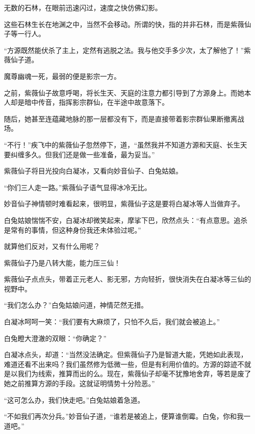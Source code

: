 
\begin{this_body}

无数的石林，在眼前迅速闪过，速度之快仿佛幻影。

这些石林生长在地渊之中，当然不会移动。所谓的快，指的并非石林，而是紫薇仙子等一行人。

“方源既然能伏杀了主上，定然有逃脱之法。我与他交手多少次，太了解他了！”紫薇仙子道。

魔尊幽魂一死，最弱的便是影宗一方。

之前，紫薇仙子故意呼喝，将长生天、天庭的注意力都引导到了方源身上。而她本人却是暗中传音，指挥影宗群仙，在半途中故意落下。

随后，她甚至连蕴藏地脉的那一层都没有下，而是直接带着影宗群仙果断撤离战场。

“不行！”疾飞中的紫薇仙子忽然停下，道，“虽然我并不知道方源和天庭、长生天要纠缠多久。但我们还是做一些准备，最为妥当。”

紫薇仙子将目光投向白凝冰，又看向妙音仙子、白兔姑娘。

“你们三人走一路。”紫薇仙子语气显得冰冷无比。

妙音仙子神情顿时难看起来，很明显，紫薇仙子这是要将白凝冰等人当做弃子。

白兔姑娘惴惴不安，白凝冰却微笑起来，摩挲下巴，欣然点头：“有点意思。追杀是常有的事情，但这种身份我还未体验过呢。”

就算他们反对，又有什么用呢？

紫薇仙子乃是八转大能，能力压三仙！

紫薇仙子点点头，带着正元老人、影无邪，方向轻折，很快消失在白凝冰等三仙的视野中。

“我们怎么办？”白兔姑娘问道，神情茫然无措。

白凝冰呵呵一笑：“我们要有大麻烦了，只怕不久后，我们就会被追上。”

白兔瞪大澄澈的双眼：“你确定？”

白凝冰点头，却道：“当然没法确定。但紫薇仙子乃是智道大能，凭她如此表现，难道还看不出来吗？我们虽然修为低微一些，但是有利用价值的。方源的踪迹不就是以我们为线索，推算而出的么。现在，紫薇仙子却毫不犹豫地舍弃，等若是废了她之前推算方源的手段。这就证明情势十分险恶。”

“这可怎么办，我们快走吧。”白兔姑娘着急道。

“不如我们再次分兵。”妙音仙子道，“谁若是被追上，便算谁倒霉。白兔，你和我一道吧。”


\end{this_body}
